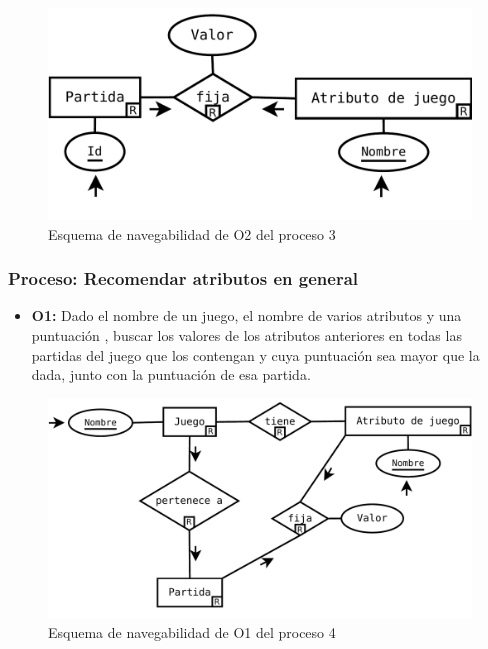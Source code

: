 \begin{figure}[h!]
	\centering
	\includegraphics[width=0.5\linewidth]{../Diagramas/pdf/Op3-2.pdf}
	\caption{Esquema de navegabilidad de O2 del proceso 3}
\end{figure}



\subsubsection{Proceso: Recomendar atributos en general}

\begin{itemize}
	\item \textbf{O1:} Dado el nombre de un juego, el nombre de varios atributos y una puntuación
		, buscar los valores de los atributos anteriores en todas las partidas del juego
		que los contengan y cuya puntuación sea mayor que la dada, junto con la puntuación
		de esa partida.\\
\end{itemize}

\begin{figure}[h!]
	\centering
	\includegraphics[width=0.5\linewidth]{../Diagramas/pdf/Op4-1.pdf}
	\caption{Esquema de navegabilidad de O1 del proceso 4}
\end{figure}

